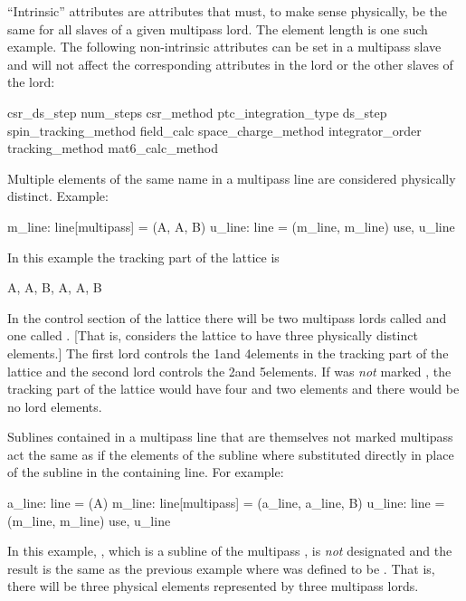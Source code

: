 ``Intrinsic'' attributes are attributes that must, to make sense physically, be the same for all
slaves of a given multipass lord. The element length is one such example.  The following
non-intrinsic attributes can be set in a multipass slave and will not affect the corresponding
attributes in the lord or the other slaves of the lord:
\begin{example}
  csr_ds_step           num_steps            
  csr_method            ptc_integration_type 
  ds_step               spin_tracking_method 
  field_calc            space_charge_method  
  integrator_order      tracking_method      
  mat6_calc_method    
\end{example}

Multiple elements of the same name in a multipass line are considered 
physically distinct. Example:
\begin{example}
  m_line: line[multipass] = (A, A, B)
  u_line: line = (m_line, m_line)
  use, u_line
\end{example}
In this example the tracking part of the lattice is
\begin{example}
  A, A, B, A, A, B
\end{example}
In the control section of the lattice there will be two multipass lords called  and one called
. [That is, \bmad considers the lattice to have three physically distinct elements.] The first
 lord controls the 1\St and 4\Th elements in the tracking part of the lattice and the second
 lord controls the 2\Nd and 5\Th elements. If  was {\em not} marked ,
the tracking part of the lattice would have four  and two  elements and there would be
no lord elements.

Sublines contained in a multipass line that are themselves not marked multipass act the same as if
the elements of the subline where substituted directly in place of the subline in the containing
line. For example:
\begin{example}
  a_line: line = (A)
  m_line: line[multipass] = (a_line, a_line, B)
  u_line: line = (m_line, m_line)
  use, u_line
\end{example}
In this example, , which is a subline of the multipass , is {\em not}
designated  and the result is the same as the previous example where  was
defined to be . That is, there will be three physical elements represented by three
multipass lords.

